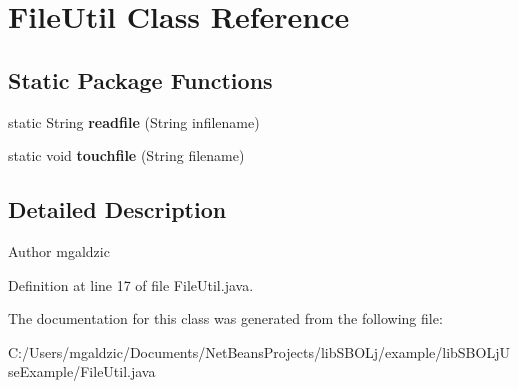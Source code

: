 \hypertarget{classlib_s_b_o_lj_use_example_1_1_file_util}{
\section{FileUtil Class Reference}
\label{classlib_s_b_o_lj_use_example_1_1_file_util}
}
\subsection*{Static Package Functions}
\begin{DoxyCompactItemize}
\item 
\hypertarget{classlib_s_b_o_lj_use_example_1_1_file_util_a37e57bec945e4ef6bf2deead2873187e}{
static String {\bfseries readfile} (String infilename)}
\label{classlib_s_b_o_lj_use_example_1_1_file_util_a37e57bec945e4ef6bf2deead2873187e}

\item 
\hypertarget{classlib_s_b_o_lj_use_example_1_1_file_util_a258a9cf42dbe73be9eb2baf3719ad2d0}{
static void {\bfseries touchfile} (String filename)}
\label{classlib_s_b_o_lj_use_example_1_1_file_util_a258a9cf42dbe73be9eb2baf3719ad2d0}

\end{DoxyCompactItemize}


\subsection{Detailed Description}
\begin{DoxyAuthor}{Author}
mgaldzic 
\end{DoxyAuthor}


Definition at line 17 of file FileUtil.java.



The documentation for this class was generated from the following file:\begin{DoxyCompactItemize}
\item 
C:/Users/mgaldzic/Documents/NetBeansProjects/libSBOLj/example/libSBOLjUseExample/FileUtil.java\end{DoxyCompactItemize}
